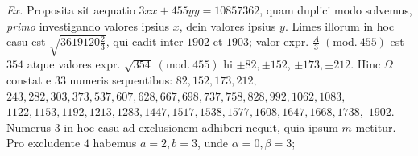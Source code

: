 \textit{Ex.} Proposita sit aequatio \(3xx+455yy=10857362\), quam duplici modo solvemus, \textit{primo} investigando valores ipsius \(x\), dein valores ipsius \(y\). Limes illorum in hoc casu est \(\surd{3619120\frac23}\), qui cadit inter \(1902\) et \(1903\); valor expr. \(\frac A3\; (\mathrm{mod}.\ 455)\) est \(354\) atque valores expr. \(\surd{354}\; (\mathrm{mod}.\ 455)\) hi \(\pm82,\allowbreak \pm152\), \(\pm173,\allowbreak \pm212\). Hinc \(\Omega\) constat e \(33\) numeris sequentibus: \(82,\allowbreak 152,\allowbreak 173,\allowbreak 212,\allowbreak \) \(243,\allowbreak 282,\allowbreak 303,\allowbreak 373,\allowbreak 537,\allowbreak 607,\allowbreak 628,\allowbreak 667,\allowbreak 698,\allowbreak 737,\allowbreak 758,\allowbreak 828,\allowbreak 992,\allowbreak 1062,\allowbreak 1083,\allowbreak \) \(1122,\allowbreak 1153,\allowbreak 1192,\allowbreak 1213,\allowbreak 1283,\allowbreak 1447,\allowbreak 1517,\allowbreak 1538,\allowbreak 1577,\allowbreak 1608,\allowbreak 1647,\allowbreak 1668,\allowbreak 1738,\allowbreak \) \(1902\). Numerus \(3\) in hoc casu ad exclusionem adhiberi nequit, quia ipsum \(m\) metitur. Pro excludente \(4\) habemus \(a=2,\allowbreak b=3\), unde \(\alpha=0,\allowbreak \beta=3\);
